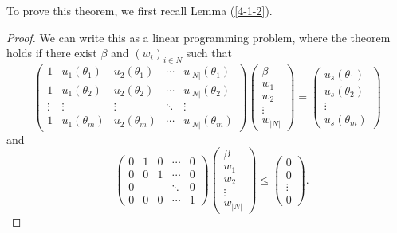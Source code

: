 To prove this theorem, we first recall Lemma (\ref{4-1-2}). 

\begin{proof}
	We can write this as a linear programming problem, where the theorem holds if there exist $\beta$ and $(w_i)_{i \in N}$ such that \[
		\begin{pmatrix}
			1 & u_1(\theta_1) & u_2(\theta_1) & \cdots & u_{\left| N \right|}(\theta_1) \\
			1 & u_1(\theta_2) & u_2(\theta_2) & \cdots & u_{\left| N \right|}(\theta_2) \\
			\vdots & \vdots & \vdots & \ddots & \vdots \\
			1 & u_1(\theta_{m}) & u_2(\theta_m) & \cdots & u_{\left| N \right|}(\theta_m)
		\end{pmatrix} \begin{pmatrix}
		\beta \\
		w_1 \\
		w_2 \\
		\vdots \\
		w_{\left| N \right|}
		\end{pmatrix} = \begin{pmatrix}
		u_s(\theta_1) \\
		u_s(\theta_2) \\
		\vdots \\
		u_{s}(\theta_m)
		\end{pmatrix} 
	\] and \[
	-\begin{pmatrix}
		0 & 1 & 0 & \cdots & 0 \\
		0 & 0 & 1 & \cdots & 0 \\
		0 &  &  & \ddots & 0 \\
		0 & 0 & 0 & \cdots & 1
	\end{pmatrix} \begin{pmatrix}
		\beta \\
		w_1 \\
		w_2 \\
		\vdots \\
		w_{\left| N \right|}
		\end{pmatrix} \le \begin{pmatrix}
		0  \\
		0 \\ \vdots \\ 0
		\end{pmatrix} 
	.\] 


\end{proof}
